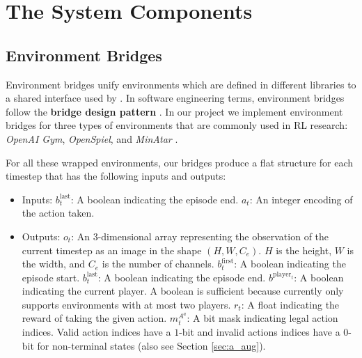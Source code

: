 \section{The \moozi System Components}
\subsection{Environment Bridges} \label{sec:env_bridge}

Environment bridges unify environments which are defined in different libraries to a shared interface used by \moozi.
In software engineering terms, environment bridges follow the \textbf{bridge design pattern} \cite{BridgePattern__2022}.
In our project we implement environment bridges for three types of environments that are commonly used in RL research: \textit{OpenAI Gym}, \textit{OpenSpiel}, and \textit{MinAtar} \cite{OpenAIGym_Brockman.Cheung.ea_2016,OpenSpielFrameworkReinforcement_Lanctot.Lockhart.ea_2020,MinAtarAtariInspiredTestbed_Young.Tian_2019}.

For all these wrapped environments, our bridges produce a flat structure for each timestep that has the following inputs and outputs:
\begin{itemize}
    \item Inputs:
          \subitem $b^{\text{last}}_{t}$: A boolean indicating the episode end.
          \subitem $a_t$: An integer encoding of the action taken.
    \item Outputs:
          \subitem $o_t$:
          An 3-dimensional array representing the observation of the current timestep as an image
          in the shape $(H, W, C_e)$. $H$ is the height, $W$ is the width, and $C_e$ is the number of channels.
          \subitem $b^{\text{first}}_{t}$: A boolean indicating the episode start.
          \subitem $b^{\text{last}}_{t}$: A boolean indicating the episode end.
          \subitem $b^{\text{player}_{t}}$: A boolean indicating the current player. A boolean is sufficient because \moozi currently only supports environments with at most two players.
          \subitem $r_t$: A float indicating the reward of taking the given action.
          \subitem $m^{A^a}_t$: A bit mask indicating legal action indices. Valid
          action indices have a $1$-bit and invalid actions indices have a $0$-bit for non-terminal states (also see Section \ref{sec:a_aug}).
\end{itemize}

